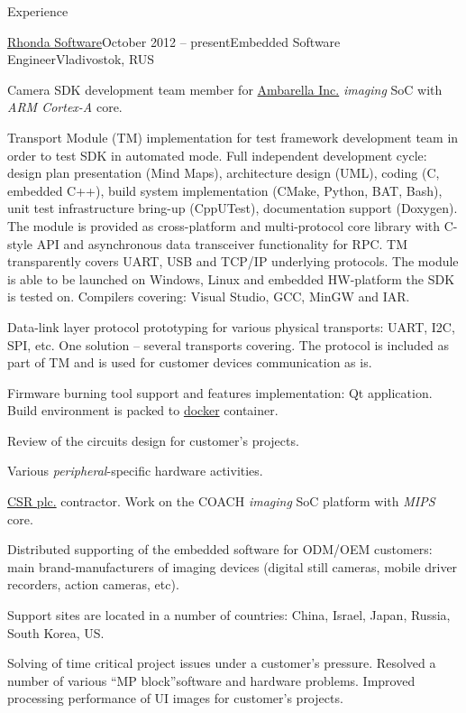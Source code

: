 \documentclass{template}
\begin{document}

\begin{rSection}{Experience}
\begin{rCompany}{\href{http://www.rhondasoftware.com}{Rhonda Software}}{October 2012 -- present}{Embedded Software Engineer}{Vladivostok, RUS}
\item Camera SDK development team member for \href{http://www.ambarella.com}{Ambarella Inc.} \textit{imaging} SoC with \textit{ARM Cortex-A} core.
\item Transport Module (TM) implementation for test framework development team in order to test SDK in automated mode. Full independent development cycle: design plan presentation (Mind Maps), architecture design (UML), coding (C, embedded C++), build system implementation (CMake, Python, BAT, Bash), unit test infrastructure bring-up (CppUTest), documentation support (Doxygen). The module is provided as cross-platform and multi-protocol core library with C-style API and asynchronous data transceiver functionality for RPC. TM transparently covers UART, USB and TCP/IP underlying protocols. The module is able to be launched on Windows, Linux and embedded HW-platform the SDK is tested on. Compilers covering: Visual Studio, GCC, MinGW and IAR.
\item Data-link layer protocol prototyping for various physical transports: UART, I2C, SPI, etc. One solution -- several transports covering. The protocol is included as part of TM and is used for customer devices communication as is.
\item Firmware burning tool support and features implementation: Qt application. Build environment is packed to \href{www.docker.com}{docker} container.
\item Review of the circuits design for customer's projects.
\item Various \textit{peripheral}-specific hardware activities. \newline
\item \href{http://www.csr.com}{CSR plc.} contractor. Work on the COACH \textit{imaging} SoC platform with \textit{MIPS} core.
\item Distributed supporting of the embedded software for ODM/OEM customers: main brand-manufacturers of imaging devices (digital still cameras, mobile driver recorders, action cameras, etc).
\item Support sites are located in a number of countries: China, Israel, Japan, Russia, South Korea, US.
\item Solving of time critical project issues under a customer's pressure. Resolved a number of various \textquotedblleft MP block\textquotedblright software and hardware problems. Improved processing performance of UI images for customer's projects.

\end{rCompany}
\end{rSection}
\end{document}
